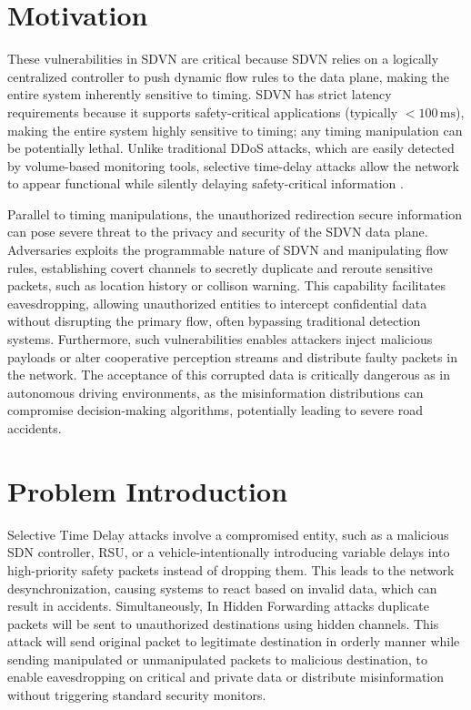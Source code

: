 \documentclass[12pt, a4paper]{report}
\begin{document}
\section{Motivation}

These vulnerabilities in SDVN are critical because SDVN relies on a logically centralized controller to push dynamic flow rules to the data plane, making the entire system inherently sensitive to timing\cite{8187644}\cite{7981537}. SDVN has strict latency requirements because it supports safety-critical applications (typically $<100\,\mathrm{ms}$), making the entire system highly sensitive to timing; any timing manipulation can be potentially lethal.\cite{Timing_Attack}\cite{KALUPAHANALIYANAGE2018226}
Unlike traditional DDoS attacks, which are easily detected by volume-based monitoring tools, selective time-delay attacks allow the network to appear functional while silently delaying safety-critical information \cite{PASCOAL2020107223}\cite{DBLP:journals/air/QammarKND23}.

Parallel to timing manipulations, the unauthorized redirection secure information can pose severe threat to the privacy and security of the SDVN data plane. Adversaries exploits the programmable nature of SDVN and manipulating flow rules, establishing covert channels to secretly duplicate and reroute sensitive packets, such as location history or collison warning. This capability facilitates eavesdropping, allowing unauthorized entities to intercept confidential data without disrupting the primary flow, often bypassing traditional detection systems\cite{mohammadi2016detecting}. Furthermore, such vulnerabilities enables attackers inject malicious payloads or alter cooperative perception streams and distribute faulty packets in the network. The acceptance of this corrupted data is critically dangerous as  in autonomous driving environments, as the misinformation distributions can compromise decision-making algorithms, potentially leading to severe road accidents\cite{Cardona_2020}\cite{8616999}.

\section{Problem Introduction}

Selective Time Delay attacks involve a compromised entity, such as a malicious SDN controller, RSU, or a vehicle-intentionally introducing variable delays into high-priority safety packets \cite{Timing_Attack} instead of dropping them\cite{Timing_Attack}. This leads to the network desynchronization, causing systems to react based on invalid data, which can result in accidents\cite{Timing_Attack}. Simultaneously, In Hidden Forwarding attacks duplicate packets will be sent to unauthorized destinations using hidden channels. This attack will send original packet to legitimate destination in orderly manner while sending manipulated or unmanipulated packets to malicious destination, to enable eavesdropping on critical and private data or distribute misinformation without triggering standard security monitors.
\end{document}
